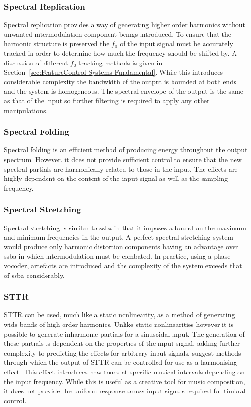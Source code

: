 		\subsubsection*{Spectral Replication}
			Spectral replication provides a way of generating higher order harmonics without unwanted
			intermodulation component beings introduced. To ensure that the harmonic structure is preserved the
			$f_{0}$ of the input signal must be accurately tracked in order to determine how much the frequency
			should be shifted by. A discussion of different $f_{0}$ tracking methods is given in
			Section~\ref{sec:FeatureControl-Systems-Fundamental}. While this introduces considerable complexity
			the bandwidth of the output is bounded at both ends and the system is homogeneous. The spectral
			envelope of the output is the same as that of the input so further filtering is required to apply
			any other manipulations.

		\subsubsection*{Spectral Folding}
			Spectral folding is an efficient method of producing energy throughout the output spectrum.
			However, it does not provide sufficient control to ensure that the new spectral partials are
			harmonically related to those in the input. The effects are highly dependent on the content of the
			input signal as well as the sampling frequency.

		\subsubsection*{Spectral Stretching}
			Spectral stretching is similar to \acrshort{ssba} in that it imposes a bound on the maximum and
			minimum frequencies in the output. A perfect spectral stretching system would produce only harmonic
			distortion components having an advantage over \acrshort{ssba} in which intermodulation must be
			combated. In practice, using a phase vocoder, artefacts are introduced and the complexity of the
			system exceeds that of \acrshort{ssba} considerably.

		\subsubsection*{STTR}
			STTR can be used, much like a static nonlinearity, as a method of generating wide bands of high
			order harmonics. Unlike static nonlinearities however it is possible to generate inharmonic
			partials for a sinusoidal input. The generation of these partials is dependent on the properties of
			the input signal, adding further complexity to predicting the effects for arbitrary input signals.
			\citet{kim2015harmonizing} suggest methods through which the output of STTR can be controlled for
			use as a harmonising effect. This effect introduces new tones at specific musical intervals
			depending on the input frequency. While this is useful as a creative tool for music composition, it
			does not provide the uniform response across input signals required for timbral control.

